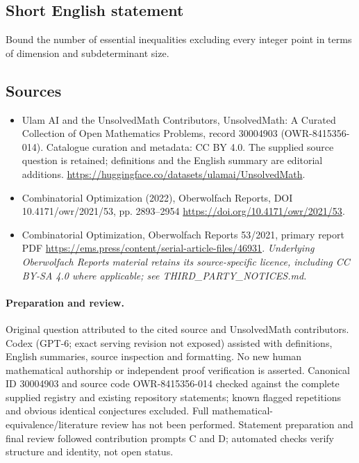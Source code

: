 \documentclass[11pt]{article}
\begin{document}
\subsection{Short English statement}
Bound the number of essential inequalities excluding every integer point in terms of dimension and subdeterminant size.
\subsection{Sources}
\begin{itemize}
\item[\hypertarget{source:30004903:1}{S1}] Ulam AI and the UnsolvedMath Contributors, UnsolvedMath: A Curated Collection of Open Mathematics Problems, record 30004903 (OWR-8415356-014). Catalogue curation and metadata: CC BY 4.0. The supplied source question is retained; definitions and the English summary are editorial additions.
\url{https://huggingface.co/datasets/ulamai/UnsolvedMath}.
\item[\hypertarget{source:30004903:2}{S2}] Combinatorial Optimization (2022), Oberwolfach Reports, DOI 10.4171/owr/2021/53, pp. 2893--2954
\url{https://doi.org/10.4171/owr/2021/53}.
\item[\hypertarget{source:30004903:3}{S3}] Combinatorial Optimization, Oberwolfach Reports 53/2021, primary report PDF
\url{https://ems.press/content/serial-article-files/46931}.
\textit{Underlying Oberwolfach Reports material retains its source-specific licence, including CC BY-SA 4.0 where applicable; see THIRD\_PARTY\_NOTICES.md.}
\end{itemize}
\paragraph{Preparation and review.}
Original question attributed to the cited source and UnsolvedMath contributors. Codex (GPT-6; exact serving revision not exposed) assisted with definitions, English summaries, source inspection and formatting. No new human mathematical authorship or independent proof verification is asserted. Canonical ID 30004903 and source code OWR-8415356-014 checked against the complete supplied registry and existing repository statements; known flagged repetitions and obvious identical conjectures excluded. Full mathematical-equivalence/literature review has not been performed. Statement preparation and final review followed contribution prompts C and D; automated checks verify structure and identity, not open status.
\label{end:30004903}
\end{document}
